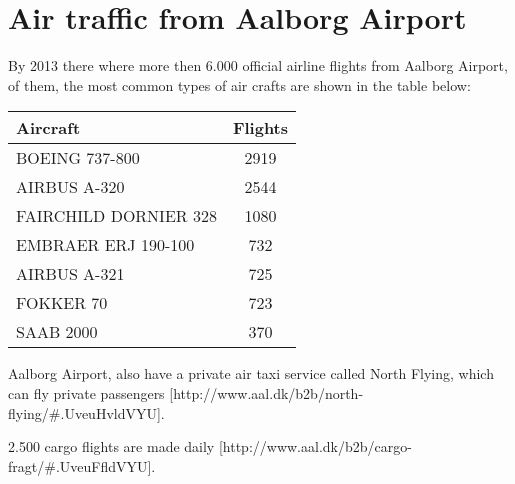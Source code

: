 \section{Air traffic from Aalborg Airport}

By 2013 there where more then 6.000 official airline flights from Aalborg Airport, of them, the most common types of air crafts are shown in the table below:

\begin{center}
    \begin{tabular}{ | l | c | }
        \hline
        Aircraft & Flights\\ \hline
        BOEING 737-800 & 2919\\ \hline
        AIRBUS A-320 & 2544\\ \hline
        FAIRCHILD DORNIER 328 & 1080\\ \hline
        EMBRAER ERJ 190-100 & 732\\ \hline
        AIRBUS A-321 & 725\\ \hline
        FOKKER 70 & 723\\ \hline
        SAAB 2000 & 370\\ \hline
    \end{tabular}
\end{center}


Aalborg Airport, also have a private air taxi service called North Flying, which can fly private passengers [http://www.aal.dk/b2b/north-flying/\#.UveuHvldVYU].

2.500 cargo flights are made daily [http://www.aal.dk/b2b/cargo-fragt/\#.UveuFfldVYU].

